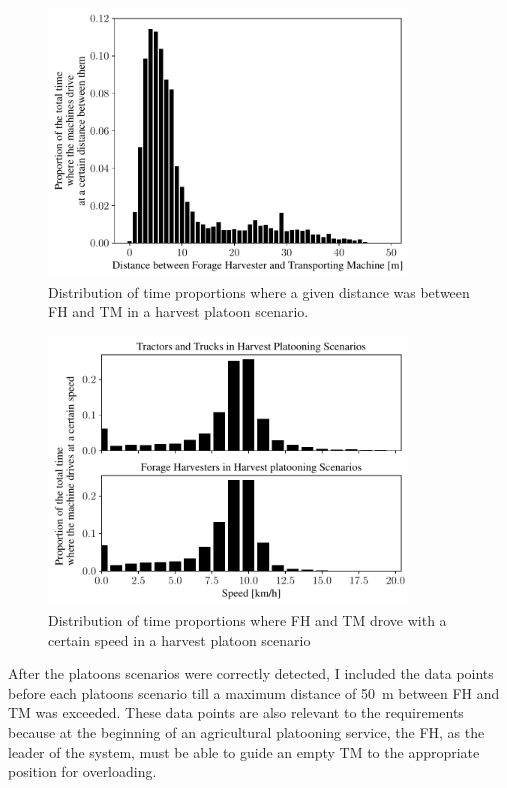 \documentclass[]{nsm-thesis}
\begin{document}
\begin{figure}%
	\centering
	\includegraphics[width=0.85\textwidth]{figures/distanceHarvestSzenario.pdf}
	\caption{Distribution of time proportions where a given distance was between \ac{FH} and \ac{TM} in a harvest platoon scenario.}%
	\label{fig:distance}%
\end{figure}
\begin{figure}%
	\centering
	\includegraphics[width=0.85\textwidth]{figures/speedHarvestSzenario.pdf}
	\caption{Distribution of time proportions where FH and TM drove with a certain speed in a harvest platoon scenario}%
	\label{fig:speed}%
\end{figure}

After the platoons scenarios were correctly detected, I included the data points before each platoons scenario till a maximum distance of \SI{50}{\metre} between \ac{FH} and \ac{TM} was exceeded. These data points are also relevant to the requirements because at the beginning of an agricultural platooning service, the \ac{FH}, as the leader of the system, must be able to guide an empty \ac{TM} to the appropriate position for overloading.
\end{document}
